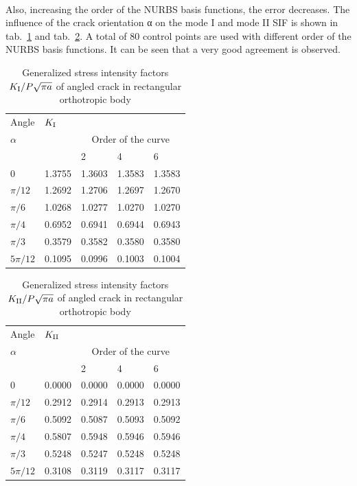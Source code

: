 \paragraph{}
Also, increasing the order of the NURBS basis functions, the error decreases.
The influence of the crack orientation α on the mode \RN{1} and mode \RN{2} SIF is shown in tab.~\ref{iso_tab:angled_crack_sif_1} and tab.~\ref{iso_tab:angled_crack_sif_2}.
A total of 80 control points are used with different order of the NURBS basis functions.
It can be seen that a very good agreement is observed.
\begin{table}
\caption{Generalized stress intensity factors $K_\RN{1}/P\sqrt{\pi a}$ of angled crack in rectangular orthotropic body}
\label{iso_tab:angled_crack_sif_1}
\begin{tabularx}{\textwidth}{XXXXX}
    \toprule
    Angle   &   $K_\RN{1}$  &   \multicolumn{3}{c}{ }  \\
    \cmidrule{2-5} 
    $\alpha$&\cite{Banks2005}&  \multicolumn{3}{c}{Order of the curve}  \\
    \cmidrule{3-5} 
    & & 2 & 4 & 6 \\
    \midrule
    0         & 1.3755 & 1.3603 & 1.3583 & 1.3583 \\
    $\pi/12 $ & 1.2692 & 1.2706 & 1.2697 & 1.2670 \\
    $\pi/ 6 $ & 1.0268 & 1.0277 & 1.0270 & 1.0270 \\
    $\pi/ 4 $ & 0.6952 & 0.6941 & 0.6944 & 0.6943 \\
    $\pi /3 $ & 0.3579 & 0.3582 & 0.3580 & 0.3580 \\
    $5\pi/12$ & 0.1095 & 0.0996 & 0.1003 & 0.1004 \\
    \bottomrule
\end{tabularx}
\end{table}

\begin{table}
    \caption{Generalized stress intensity factors $K_\RN{2}/P\sqrt{\pi a}$ of angled crack in rectangular orthotropic body}
    \label{iso_tab:angled_crack_sif_2}
    \begin{tabularx}{\textwidth}{XXXXX}
        \toprule
        Angle   &   $K_\RN{2}$  &   \multicolumn{3}{c}{ }\\
        \cmidrule{2-5}
        $\alpha$&\cite{Banks2005}&  \multicolumn{3}{c}{Order of the curve}\\
        \cmidrule{3-5}
        & & 2 & 4 & 6 \\
        \midrule
        0         & 0.0000 & 0.0000 & 0.0000 & 0.0000 \\
        $\pi/12 $ & 0.2912 & 0.2914 & 0.2913 & 0.2913 \\
        $\pi/ 6 $ & 0.5092 & 0.5087 & 0.5093 & 0.5092 \\
        $\pi/ 4 $ & 0.5807 & 0.5948 & 0.5946 & 0.5946 \\
        $\pi /3 $ & 0.5248 & 0.5247 & 0.5248 & 0.5248 \\
        $5\pi/12$ & 0.3108 & 0.3119 & 0.3117 & 0.3117 \\
        \bottomrule
    \end{tabularx}
\end{table}

\pagebreak